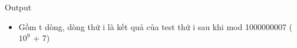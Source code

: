 Output  
\begin{itemize}
	\item     Gồm t dòng, dòng thứ i là kết quả của test thứ i sau khi mod 1000000007 ($10^{9}$    + 7)   
\end{itemize}